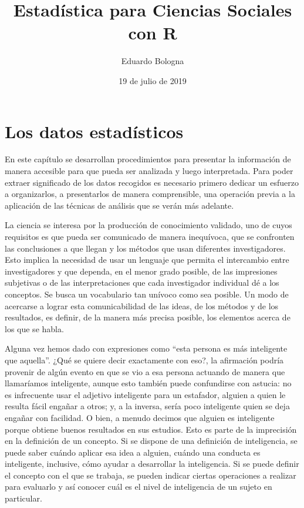 \documentclass[]{book}
\title{Estadística para Ciencias Sociales con R}
\author{Eduardo Bologna}
\date{19 de julio de 2019}
\begin{document}
\maketitle

{
\hypersetup{linkcolor=black}
\setcounter{tocdepth}{1}
\tableofcontents
}
\listoftables
\listoffigures
\hypertarget{section}{%
\chapter*{}\label{section}}

\hypertarget{los-datos-estadisticos}{%
\chapter{Los datos estadísticos}\label{los-datos-estadisticos}}

En este capítulo se desarrollan procedimientos para presentar la información de manera accesible para que pueda ser analizada y luego interpretada. Para poder extraer significado de los datos recogidos es necesario primero dedicar un esfuerzo a organizarlos, a presentarlos de manera comprensible, una operación previa a la aplicación de las técnicas de análisis que se verán más adelante.

La ciencia se interesa por la producción de conocimiento validado, uno de cuyos requisitos es que pueda ser comunicado de manera inequívoca, que se confronten las conclusiones a que llegan y los métodos que usan diferentes investigadores. Esto implica la necesidad de usar un lenguaje que permita el intercambio entre investigadores y que dependa, en el menor grado posible, de las impresiones subjetivas o de las interpretaciones que cada investigador individual dé a los conceptos. Se busca un vocabulario tan unívoco como sea posible. Un modo de acercarse a lograr esta comunicabilidad de las ideas, de los métodos y de los resultados, es definir, de la manera más precisa posible, los elementos acerca de los que se habla.

Alguna vez hemos dado con expresiones como ``esta persona es más inteligente que aquella''. ¿Qué se quiere decir exactamente con eso?, la afirmación podría provenir de algún evento en que se vio a esa persona actuando de manera que llamaríamos inteligente, aunque esto también puede confundirse con astucia: no es infrecuente usar el adjetivo inteligente para un estafador, alguien a quien le resulta fácil engañar a otros; y, a la inversa, sería poco inteligente quien se deja engañar con facilidad. O bien, a menudo decimos que alguien es inteligente porque obtiene buenos resultados en sus estudios. Esto es parte de la imprecisión en la definición de un concepto. Si se dispone de una definición de inteligencia, se puede saber cuándo aplicar esa idea a alguien, cuándo una conducta es inteligente, inclusive, cómo ayudar a desarrollar la inteligencia. Si se puede definir el concepto con el que se trabaja, se pueden indicar ciertas operaciones a realizar para evaluarlo y así conocer cuál es el nivel de inteligencia de un sujeto en particular.
\end{document}
